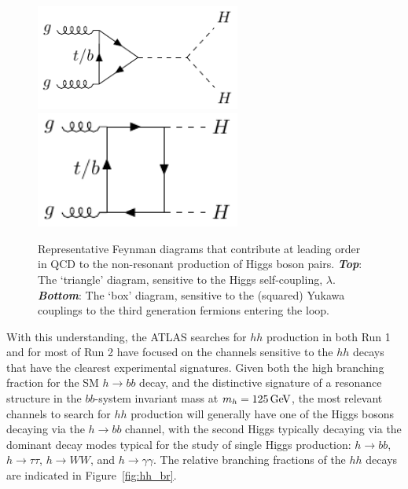 \begin{figure}[!htb]
    \begin{center}
        \includegraphics[width=0.6\textwidth]{figures/search_hh/feynman_diagrams/fdiagram_triangle}
        \includegraphics[width=0.6\textwidth]{figures/search_hh/feynman_diagrams/fdiagram_box}
        \caption{
            Representative Feynman diagrams that contribute at leading order in QCD to the non-resonant
            production of Higgs boson pairs.
            {\textbf{\textit{Top}}}: The `triangle' diagram, sensitive to the Higgs self-coupling, $\lambda$.
            {\textbf{\textit{Bottom}}}: The `box' diagram, sensitive to the (squared) Yukawa couplings to the third generation
            fermions entering the loop.
        }
        \label{fig:hh_feynman}
    \end{center}
\end{figure}

With this understanding, the ATLAS searches for $hh$ production in both Run 1 and for most of Run 2 have focused
on the channels sensitive to the $hh$ decays that have the clearest experimental signatures.
Given both the high branching fraction for the SM $h \rightarrow bb$ decay, and the distinctive signature
of a resonance structure in the $bb$-system invariant mass at $m_h = 125\,\text{Ge\kern -0.1em V}$, the most relevant channels to search for $hh$
production will generally have one of the Higgs bosons decaying via the $h \rightarrow bb$ channel, with the
second Higgs typically decaying via the dominant decay modes typical for the study of single Higgs production: $h \rightarrow bb$, $h \rightarrow \tau \tau$, 
$h \rightarrow WW$, and $h \rightarrow \gamma \gamma$.
The relative branching fractions of the $hh$ decays are indicated in Figure~\ref{fig:hh_br}.

